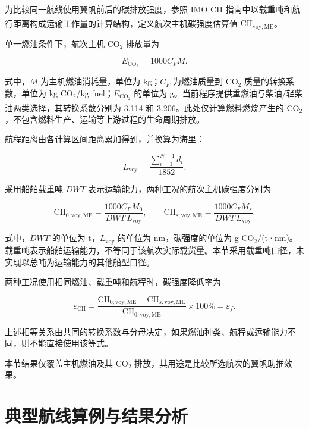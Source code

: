 \documentclass[UTF8,a4paper,twoside,zihao=5,fontset=windows]{ctexart}
\begin{document}
为比较同一航线使用翼帆前后的碳排放强度，参照 IMO CII 指南中以载重吨和航行距离构成运输工作量的计算结构，定义航次主机碳强度估算值 $\mathrm{CII}_{\mathrm{voy,ME}}$\textsuperscript{\cite{imo2022cii}}。

单一燃油条件下，航次主机 CO$_2$ 排放量为

\begin{equation}
E_{\mathrm{CO_2}}=1000C_FM.
\label{eq:fuel-cii-8}
\end{equation}

式中，$M$ 为主机燃油消耗量，单位为 kg；$C_F$ 为燃油质量到 CO$_2$ 质量的转换系数，单位为 kg CO$_2$/kg fuel；$E_{\mathrm{CO_2}}$ 的单位为 g。当前程序提供重燃油与柴油/轻柴油两类选择，其转换系数分别为 3.114 和 3.206\textsuperscript{\cite{imo2022eedi}}。此处仅计算燃料燃烧产生的 CO$_2$，不包含燃料生产、运输等上游过程的生命周期排放。

航程距离由各计算区间距离累加得到，并换算为海里：

\begin{equation}
L_{\mathrm{voy}}=\frac{\sum_{i=1}^{N-1}d_i}{1852}.
\label{eq:fuel-cii-9}
\end{equation}

采用船舶载重吨 $DWT$ 表示运输能力，两种工况的航次主机碳强度分别为

\begin{equation}
\mathrm{CII}_{0,\mathrm{voy,ME}}=
\frac{1000C_FM_0}{DWT\,L_{\mathrm{voy}}},\qquad
\mathrm{CII}_{s,\mathrm{voy,ME}}=
\frac{1000C_FM_s}{DWT\,L_{\mathrm{voy}}}.
\label{eq:fuel-cii-10}
\end{equation}

式中，$DWT$ 的单位为 t，$L_{\mathrm{voy}}$ 的单位为 nm，碳强度的单位为 g CO$_2$/(t·nm)。载重吨表示船舶运输能力，不等同于该航次实际载货量。本节采用载重吨口径，未实现以总吨为运输能力的其他船型口径。

两种工况使用相同燃油、载重吨和航程时，碳强度降低率为

\begin{equation}
\varepsilon_{\mathrm{CII}}=
\frac{\mathrm{CII}_{0,\mathrm{voy,ME}}-
\mathrm{CII}_{s,\mathrm{voy,ME}}}
{\mathrm{CII}_{0,\mathrm{voy,ME}}}\times100\%
=\varepsilon_f.
\label{eq:fuel-cii-11}
\end{equation}

上述相等关系由共同的转换系数与分母决定，如果燃油种类、航程或运输能力不同，则不能直接使用该等式。

本节结果仅覆盖主机燃油及其 CO$_2$ 排放，其用途是比较所选航次的翼帆助推效果。

\section{典型航线算例与结果分析}
\label{sec:case}
\end{document}
